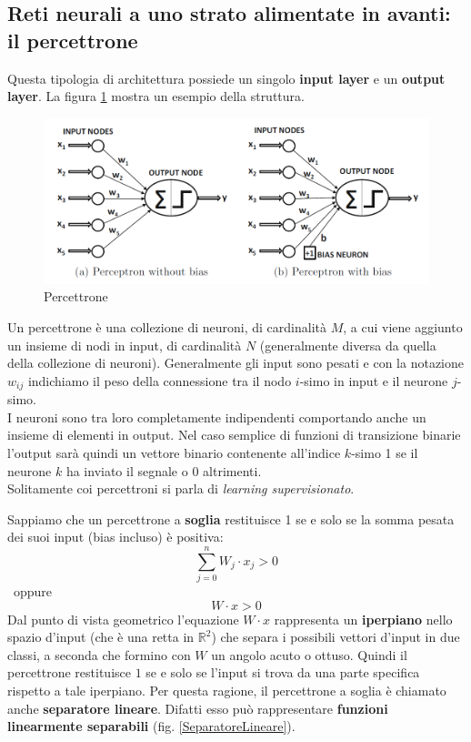 \subsection{Reti neurali a uno strato alimentate in avanti: il percettrone}
Questa tipologia di architettura possiede un singolo \textbf{input layer} e un \textbf{output layer}. La figura \ref{Percettrone} mostra un esempio della struttura.
\begin{figure}[h]
	\centering
	\includegraphics[width=1\textwidth]{img/Capture.PNG}
	\caption{Percettrone}
	\label{Percettrone}
\end{figure}
\begin{definizione}
	Un percettrone è una collezione di neuroni, di cardinalità $M$, a cui viene
	aggiunto un insieme di nodi in input, di cardinalità $N$ (generalmente
	diversa da quella della collezione di neuroni). Generalmente gli input sono
	pesati e con la notazione $w_{ij}$ indichiamo il peso della connessione tra il
	nodo $i$-simo in input e il neurone $j$-simo.\\
	I neuroni sono tra loro completamente indipendenti comportando anche un
	insieme di elementi in output. Nel caso semplice di funzioni di transizione
	binarie l'output sarà quindi un vettore binario contenente all'indice $k$-simo
	1 se il neurone $k$ ha inviato il segnale o 0 altrimenti. \\
	Solitamente coi percettroni si parla di \textit{learning supervisionato}.
\end{definizione}
Sappiamo che un percettrone a \textbf{soglia} restituisce 1 se e solo se la somma pesata dei suoi input (bias incluso) è positiva:
\[\sum_{j=0}^n W_j\cdot x_j > 0\]\,\,\,\mbox{oppure}\,\,\,\[W\cdot x > 0\]
Dal punto di vista geometrico l'equazione $W\cdot x$ rappresenta un 
\textbf{iperpiano} nello spazio d'input (che è una retta in $\mathbb{R}^2$) che separa i possibili
vettori d'input in due classi, a seconda che formino con $W$ un angolo acuto o
ottuso. Quindi il percettrone restituisce $1$ se e solo se l'input si trova da una parte specifica rispetto a tale iperpiano. Per questa ragione, il percettrone a soglia è chiamato anche \textbf{separatore lineare}. Difatti esso può rappresentare \textbf{funzioni linearmente separabili} (fig. \ref{SeparatoreLineare}).\\
